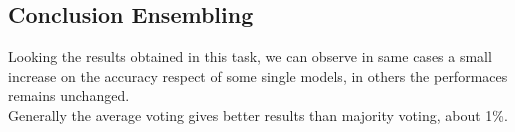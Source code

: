 \documentclass{article}
\begin{document}
\subsection{Conclusion Ensembling}
Looking the results obtained in this task, we can observe in same cases a small increase on the accuracy respect of some single models, in others the performaces remains unchanged.\\
Generally the average voting gives better results than majority voting, about 1\%.
\end{document}

